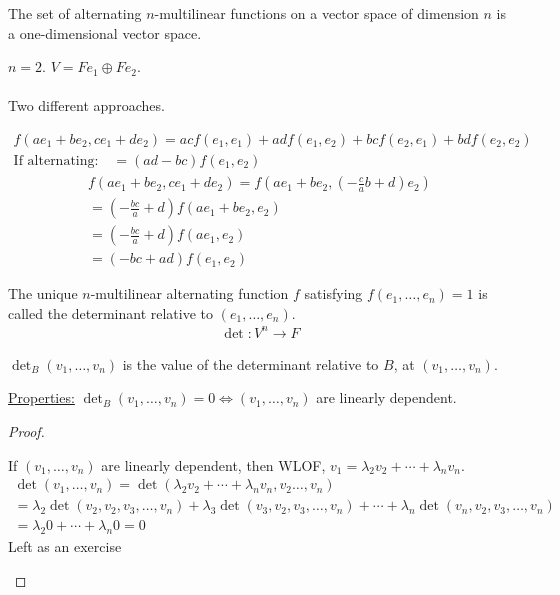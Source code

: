 \documentclass[class=scrartcl, crop=false]{standalone}
\begin{document}
\begin{theorem}
  The set of alternating $n$-multilinear functions on a vector space of dimension $n$ is a one-dimensional vector space.
  \begin{example}
    $n = 2$. $V = Fe_1 \oplus Fe_2$.
    \\\\
    Two different approaches.
    \begin{enumerate}
      \ii
      \begin{gather*}
        f(a e_1 + b e_2, c e_1 + d e_2) = acf(e_1, e_1) + adf(e_1, e_2) + bcf(e_2, e_1) + bdf(e_2, e_2) \\
        \text{If alternating:} \quad = (ad - bc)f(e_1, e_2)
      \end{gather*} 
      \ii
      \begin{gather*}
        f(ae_1 + be_2, ce_1 + de_2) = f(ae_1 + be_2, (-\frac{c}{a}b + d)e_2) \\
        = (-\frac{bc}{a} + d)f(ae_1 + be_2, e_2) \\
        = (-\frac{bc}{a} + d)f(ae_1, e_2) \\
        = (-bc + ad)f(e_1, e_2)
      \end{gather*} 
    \end{enumerate} 
  \end{example} 
\end{theorem} 

\begin{definition}
  The unique $n$-multilinear alternating function $f$ satisfying $f(e_1, \dots, e_n) = 1$ is called the determinant relative to $(e_1, \dots, e_n)$.
  \begin{gather*}
    \det: V^n \to F
  \end{gather*} 
  \begin{note}
    $\det_B(v_1, \dots, v_n)$ is the value of the determinant relative to $B$, at $(v_1, \dots, v_n)$.
  \end{note} 
  \ul{Properties:} $\det_B(v_1, \dots, v_n) = 0 \Leftrightarrow (v_1, \dots, v_n)$ are linearly dependent.
  \begin{proof}
    \begin{itemize}
      \ii[$\Leftarrow$ ]
      If $(v_1, \dots, v_n)$ are linearly dependent, then WLOF, $v_1 = \lambda_2 v_2 + \cdots + \lambda_n v_n$.
      \begin{gather*}
        \det(v_1, \dots, v_n) = \det(\lambda_2 v_2 + \cdots + \lambda_n v_n, v_2 \dots, v_n) \\
        = \lambda_2\det(v_2, v_2, v_3, \dots, v_n) + \lambda_3\det(v_3, v_2, v_3, \dots, v_n) + \cdots + \lambda_n\det(v_n, v_2, v_3, \dots, v_n) \\
        = \lambda_2 0 + \cdots + \lambda_n 0 = 0 %
      \end{gather*} 
      \ii[$\Rightarrow$ ]
      Left as an exercise
    \end{itemize} 
  \end{proof} 
\end{definition} 
\end{document}
